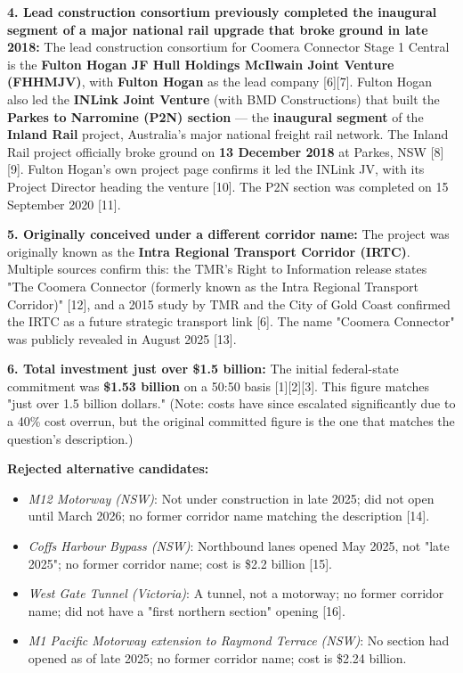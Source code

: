 \documentclass{llmxive}
\begin{document}
\begin{tcolorbox}
\textbf{4. Lead construction consortium previously completed the inaugural segment of a major national rail upgrade that broke ground in late 2018:} The lead construction consortium for Coomera Connector Stage 1 Central is the \textbf{Fulton Hogan JF Hull Holdings McIlwain Joint Venture (FHHMJV)}, with \textbf{Fulton Hogan} as the lead company [6][7]. Fulton Hogan also led the \textbf{INLink Joint Venture} (with BMD Constructions) that built the \textbf{Parkes to Narromine (P2N) section} --- the \textbf{inaugural segment} of the \textbf{Inland Rail} project, Australia's major national freight rail network. The Inland Rail project officially broke ground on \textbf{13 December 2018} at Parkes, NSW [8][9]. Fulton Hogan's own project page confirms it led the INLink JV, with its Project Director heading the venture [10]. The P2N section was completed on 15 September 2020 [11].

\textbf{5. Originally conceived under a different corridor name:} The project was originally known as the \textbf{Intra Regional Transport Corridor (IRTC)}. Multiple sources confirm this: the TMR's Right to Information release states "The Coomera Connector (formerly known as the Intra Regional Transport Corridor)" [12], and a 2015 study by TMR and the City of Gold Coast confirmed the IRTC as a future strategic transport link [6]. The name "Coomera Connector" was publicly revealed in August 2025 [13].

\textbf{6. Total investment just over \$1.5 billion:} The initial federal-state commitment was \textbf{\$1.53 billion} on a 50:50 basis [1][2][3]. This figure matches "just over 1.5 billion dollars." (Note: costs have since escalated significantly due to a 40\% cost overrun, but the original committed figure is the one that matches the question's description.)

\textbf{Rejected alternative candidates:}

\begin{itemize}[leftmargin=1.3em,topsep=2pt,itemsep=1pt,parsep=0pt]
\item \emph{M12 Motorway (NSW)}: Not under construction in late 2025; did not open until March 2026; no former corridor name matching the description [14].
\item \emph{Coffs Harbour Bypass (NSW)}: Northbound lanes opened May 2025, not "late 2025"; no former corridor name; cost is \$2.2 billion [15].
\item \emph{West Gate Tunnel (Victoria)}: A tunnel, not a motorway; no former corridor name; did not have a "first northern section" opening [16].
\item \emph{M1 Pacific Motorway extension to Raymond Terrace (NSW)}: No section had opened as of late 2025; no former corridor name; cost is \$2.24 billion.
\end{itemize}


\end{tcolorbox}
\end{document}
